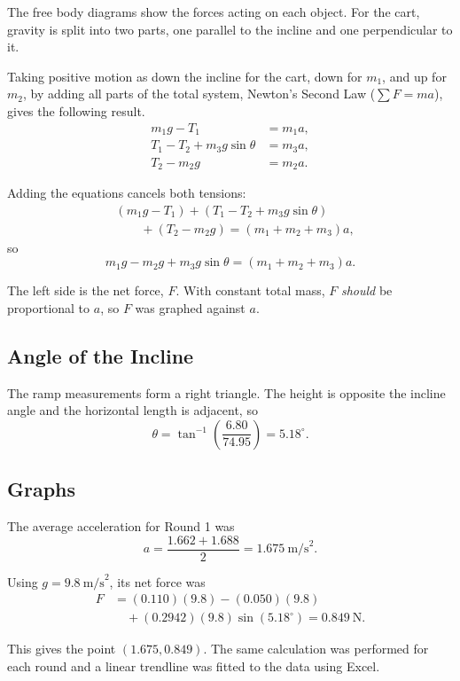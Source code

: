 \documentclass[11pt,twocolumn]{article}
\begin{document}
The free body diagrams show the forces acting on each object. For the cart, gravity is split into two parts, one parallel to the incline and one perpendicular to it.

Taking positive motion as down the incline for the cart, down for $m_1$, and up for $m_2$, by adding all parts of the total system, Newton's Second Law ($\sum F=ma$), gives the following result.
\begin{align*}
m_1g-T_1 &= m_1a,\\
T_1-T_2+m_3g\sin\theta &= m_3a,\\
T_2-m_2g &= m_2a.
\end{align*}

Adding the equations cancels both tensions:
\[
\begin{aligned}
&(m_1g-T_1)+(T_1-T_2+m_3g\sin\theta)\\
&\qquad +(T_2-m_2g)=(m_1+m_2+m_3)a,
\end{aligned}
\]
so
\[
m_1g-m_2g+m_3g\sin\theta=(m_1+m_2+m_3)a.
\]

The left side is the net force, $F$. With constant total mass, $F$ \textit{should} be proportional to $a$, so $F$ was graphed against $a$.

\subsection{Angle of the Incline}

The ramp measurements form a right triangle. The height is opposite the incline angle and the horizontal length is adjacent, so
\[
\theta=\tan^{-1}\!\left(\frac{6.80}{74.95}\right)=5.18^\circ.
\]

\subsection{Graphs}

The average acceleration for Round 1 was
\[
a=\frac{1.662+1.688}{2}=1.675\ \text{m/s}^2.
\]

Using $g=9.8\ \text{m/s}^2$, its net force was
\begin{align*}
F&=(0.110)(9.8)-(0.050)(9.8)\\
&\quad +(0.2942)(9.8)\sin(5.18^\circ)=0.849\ \text{N}.
\end{align*}

This gives the point $(1.675,0.849)$. The same calculation was performed for each round and a linear trendline was fitted to the data using Excel.
\end{document}
